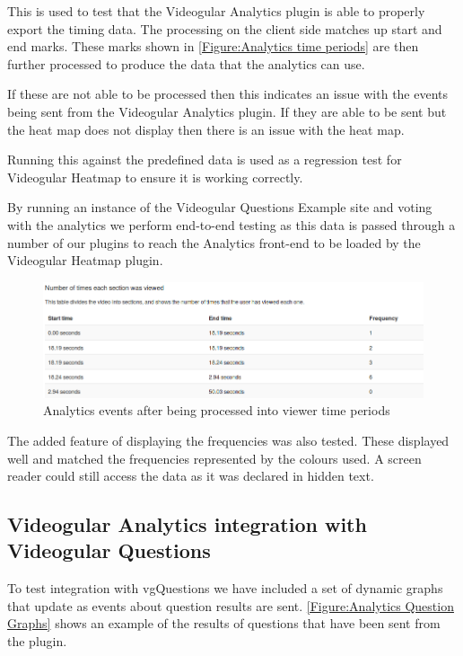 This is used to test that the \gls{Videogular} Analytics plugin is able to properly export the timing data. The processing on the client side matches up start and end marks. These marks shown in \autoref{Figure:Analytics time periods} are then further processed to produce the data that the analytics can use.

If these are not able to be processed then this indicates an issue with the events being sent from the \gls{Videogular} Analytics plugin. If they are able to be sent but the heat map does not display then there is an issue with the heat map.

Running this against the predefined data is used as a regression test for \gls{Videogular} Heatmap to ensure it is working correctly.

By running an instance of the Videogular Questions Example site and voting with the analytics we perform end-to-end testing as this data is passed through a number of our plugins to reach the Analytics front-end to be loaded by the \gls{Videogular} Heatmap plugin.

\begin{figure}[h]
	\centering
		\includegraphics[scale=0.4]{../figures/analytics_time_periods.png}
	\caption{\label{Figure:Analytics time periods} Analytics events after being processed into viewer time periods}
\end{figure}

The added feature of displaying the frequencies was also tested. These displayed well and matched the frequencies represented by the colours used. A screen reader could still access the data as it was declared in hidden text.

\subsection{Videogular Analytics integration with Videogular Questions}

To test integration with \gls{vgQuestions} we have included a set of dynamic graphs that update as events about question results are sent. \autoref{Figure:Analytics Question Graphs} shows an example of the results of questions that have been sent from the plugin.

